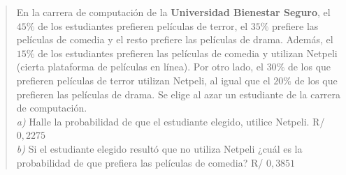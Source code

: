 \documentclass[11pt]{article}
\begin{document}
\begin{quote}
En la carrera de computación de la \textbf{Universidad Bienestar Seguro}, el $45\%$ de los estudiantes prefieren películas de terror, el $35\%$ prefiere las películas de comedia y el resto prefiere las películas de drama. Además, el $15\%$ de los estudiantes prefieren las películas de comedia y utilizan Netpeli (cierta plataforma de películas en línea). Por otro lado, el $30\%$ de los que prefieren películas de terror utilizan Netpeli, al igual que el $20\%$ de los que prefieren las películas de drama. Se elige al azar un estudiante de la carrera de computación.\\
\emph{a)} Halle la probabilidad de que el estudiante elegido, utilice Netpeli. \hfill R/ $0,2275$\\
\emph{b)} Si el estudiante elegido resultó que no utiliza Netpeli ¿cuál es la probabilidad de que prefiera las películas de comedia? \hfill R/ $0,3851$
\end{quote}
\end{document}

